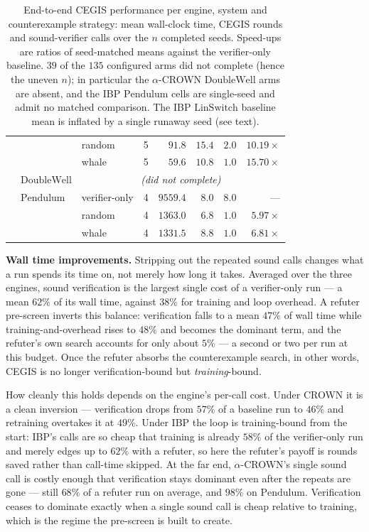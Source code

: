\begin{table}[h]
\begin{tabular}{lllrrrrr}
               &              & random        & 5 & $91.8$   & $15.4$ & $2.0$  & $10.19\times$ \\
               &              & whale         & 5 & $59.6$   & $10.8$ & $1.0$  & $15.70\times$ \\
               & $\mathrm{DoubleWell}$  & \multicolumn{6}{c}{\emph{(did not complete)}} \\
               & $\mathrm{Pendulum}$ & verifier-only & 4 & $9559.4$ & $8.0$  & $8.0$  & --- \\
               &              & random        & 4 & $1363.0$ & $6.8$  & $1.0$  & $5.97\times$ \\
               &              & whale         & 4 & $1331.5$ & $8.8$  & $1.0$  & $6.81\times$ \\
\hline
\end{tabular}
\caption{End-to-end CEGIS performance per engine, system and counterexample
strategy: mean wall-clock time, CEGIS rounds and sound-verifier calls over the
$n$ completed seeds. Speed-ups are ratios of seed-matched means against the
verifier-only baseline. $39$ of the $135$ configured arms did not complete
(hence the uneven $n$); in particular the $\alpha$-CROWN $\mathrm{DoubleWell}$ arms are
absent, and the IBP $\mathrm{Pendulum}$ cells are single-seed and admit no matched
comparison. The IBP $\mathrm{LinSwitch}$ baseline mean is inflated by a single runaway seed
(see text).}
\label{tab:cegis-speedup}
\end{table}

\textbf{Wall time improvements.} Stripping out the repeated sound calls changes
what a run spends its time on, not merely how long it takes. Averaged over the
three engines, sound verification is the largest single cost of a verifier-only
run --- a mean $62\%$ of its wall time, against $38\%$ for training and loop
overhead. A refuter pre-screen inverts this balance: verification falls to a mean
$47\%$ of wall time while training-and-overhead rises to $48\%$ and becomes the
dominant term, and the refuter's own search accounts for only about $5\%$ --- a
second or two per run at this budget. Once the refuter absorbs the counterexample
search, in other words, CEGIS is no longer verification-bound but
\emph{training}-bound.

How cleanly this holds depends on the engine's per-call cost. Under CROWN it is a
clean inversion --- verification drops from $57\%$ of a baseline run to $46\%$ and
retraining overtakes it at $49\%$. Under IBP the loop is training-bound from the
start: IBP's calls are so cheap that training is already $58\%$ of the
verifier-only run and merely edges up to $62\%$ with a refuter, so here the
refuter's payoff is rounds saved rather than call-time skipped. At the far end,
$\alpha$-CROWN's single sound call is costly enough that verification stays
dominant even after the repeats are gone --- still $68\%$ of a refuter run on
average, and $98\%$ on $\mathrm{Pendulum}$. Verification ceases to dominate exactly when a single sound
call is cheap relative to training, which is the regime the pre-screen is built to
create.


